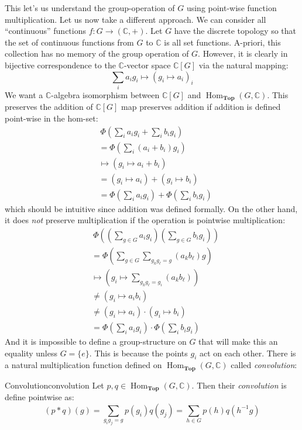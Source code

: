\documentclass{article}
\newcommand{\C}{{\mathbb{C}}}
\newcommand{\Top}{{\textbf{Top}}}
\newcommand{\Hom}{{\operatorname{Hom}}}
\begin{document}
This let's us understand the group-operation of $G$ using point-wise function multiplication. Let us now take
a different approach. We can consider all ``continuous'' functions $f: G \to (\C, +)$. Let $G$ have the
discrete topology so that the set of continuous functions from $G$ to $\C$ is all set functions. A-priori,
this collection has no memory of the group operation of $G$. However, it is clearly in bijective
correspondence to the $\C$-vector space $\C[G]$ via the natural mapping:
\[
	\sum_i a_ig_i \mapsto \left(g_i \mapsto a_i\right)_i
\]
We want a $\C$-algebra
isomorphism between $\C[G]$ and $\Hom_\Top(G, \C)$.
This preserves the addition of $\C[G]$ map preserves addition if addition is defined point-wise in the hom-set:
\begin{align*}
	&\ \Phi\left(\sum_i a_ig_i + \sum_i b_ig_i\right)\\
	&=\Phi\left(\sum_i (a_i+b_i)g_i\right)\\
	  &\mapsto (g_i \mapsto a_i+b_i)\\
	  &= (g_i \mapsto a_i) + (g_i \mapsto b_i)\\
	  &= \Phi\left(\sum_i a_ig_i\right) + \Phi\left(\sum_i b_ig_i\right)
\end{align*}
which should be intuitive since addition was defined formally. On the other hand, it does \emph{not} preserve
multiplication if the operation is pointwise multiplication:
\begin{align*}
	&\ \Phi\left(\left(\sum_{g \in G} a_ig_i\right)\left(\sum_{g\in G} b_ig_i\right)\right)\\
	&=\Phi\left(\sum_{g\in G}\sum_{g_kg_\ell=g} (a_kb_\ell)g\right)\\
	  &\mapsto (g_i \mapsto \sum_{g_kg_\ell=g_i} (a_kb_\ell))\\
	  &\ne (g_i \mapsto a_ib_i)\\
	  &\ne (g_i \mapsto a_i) \cdot (g_i \mapsto b_i)\\
	  &= \Phi\left(\sum_i a_ig_i\right) \cdot \Phi\left(\sum_i b_ig_i\right)
\end{align*}
And it is impossible to define a group-structure on $G$ that will make this an equality unless $G = \{e\}$.
This is because the points $g_i$ act on each other. There is a natural multiplication function defined on
$\Hom_\Top(G, \C)$ called \emph{convolution}:

\begin{defn}{Convolution}{convolution}
	Let $p,q \in \Hom_\Top(G, \C)$. Then their \emph{convolution} is define pointwise as:
	\[
		(p*q)(g) = \sum_{g_ig_j = g} p(g_i)q(g_j) = \sum_{h \in G}p(h)q(h^{-1}g)
	\]
\end{defn}
\end{document}
